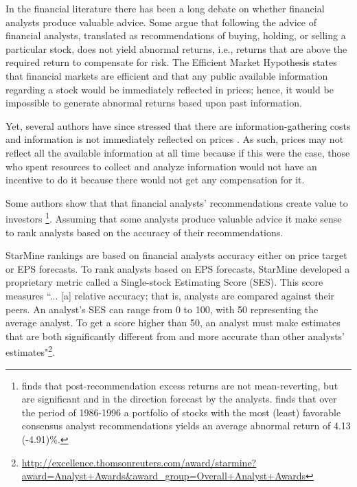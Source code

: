 \documentclass{article}\usepackage[]{graphicx}\usepackage[]{color}
\begin{document}
In the financial literature there has been a long debate on whether financial analysts produce valuable  advice. Some argue that following the advice of financial analysts,  translated as recommendations of buying, holding, or selling a particular stock, does not yield  abnormal returns, i.e.,  returns that are above the required return to compensate for risk. The Efficient Market Hypothesis \citep{fama1970ecm} states that financial markets are efficient and that any public available information  regarding a stock would be immediately reflected in prices; hence, it would be  impossible to generate abnormal returns based upon past information.

Yet, several authors have since stressed that  there are information-gathering costs and information is not immediately reflected on prices  \citep{grossman1980iie}. As such, prices may not  reflect all the available information at all time because if this were the case, those who spent resources to collect and analyze   information would not have an incentive to do it because there would not get any compensation for it.



Some authors show that that financial analysts' recommendations create value to investors \citep{womack1996,barber2001}\footnote{\cite{womack1996} finds that  post-recommendation excess returns are not mean-reverting, but are significant and in the direction forecast by the analysts. \cite{barber2001} finds that over the period of 1986-1996 a portfolio of stocks with the most (least) favorable consensus analyst recommendations yields an average abnormal return of 4.13 (-4.91)\%.}. Assuming that some analysts produce valuable advice it make sense to rank analysts based on the accuracy of their recommendations. 

StarMine rankings are based on financial analysts accuracy either on price target or EPS forecasts. To rank analysts based on EPS forecasts, StarMine developed a proprietary metric called a Single-stock Estimating Score (SES). This score measures ``... [a] relative accuracy; that is, analysts are compared against their peers. An analyst's SES can range from 0 to 100, with 50 representing the average analyst. To get a score higher than 50, an analyst must make estimates that are both significantly different from and more accurate than other analysts' estimates"\footnote{\url{http://excellence.thomsonreuters.com/award/starmine?award=Analyst+Awards&award_group=Overall+Analyst+Awards}}.
\end{document}
